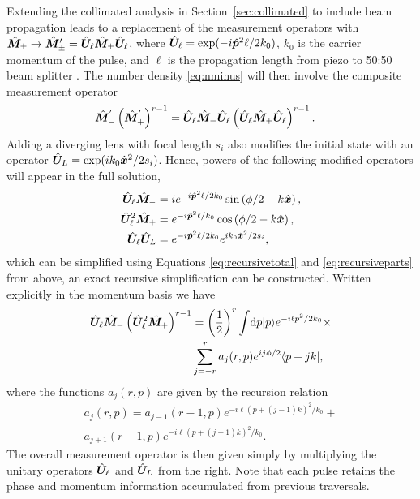 Extending the collimated analysis in Section~\ref{sec:collimated} to include beam propagation leads to a replacement of the measurement operators with $\hat{\bm M}_\pm \to \hat{\bm M}'_\pm = \hat{\bm U}_\ell \hat{\bm M}_\pm \hat{\bm U}_\ell$, where $\hat{\bm U}_\ell = \exp(-i \hat{\bm p}^2 \ell / 2 k_0)$, $k_0$ is the carrier momentum of the pulse, and $\ell$ is the propagation length from piezo to 50:50 beam splitter \cite{Born1959}.  The number density \eqref{eq:nminus} will then involve the composite measurement operator 
\begin{align}\label{eq:recursivetotal}
  \hat{\bm M}_-^{'}\left(\hat{\bm M}_+^{'}\right)^{r-1} &= \hat{\bm U}_\ell\hat{\bm M}_-\hat{\bm U}_\ell \left(\hat{\bm U}_\ell\hat{\bm M}_+\hat{\bm U}_\ell\right)^{r-1}.
\end{align}  
Adding a diverging lens with focal length $s_i$ also modifies the initial state with an operator $\hat{\bm U}_L = \exp(i k_0 \hat{\bm x}^2 / 2 s_i)$.  Hence, powers of the following modified operators will appear in the full solution,
\begin{subequations}\label{eq:recursiveparts}
\begin{align}
  \hat{\bm U}_\ell\hat{\bm M}_- &= i e^{-i\hat{\bm p}^2\ell/2k_0}\sin\left(\phi/2 - k\hat{\bm x}\right) , \\
  \hat{\bm U}_\ell^2 \hat{\bm M}_+ &= e^{-i\hat{\bm p}^2\ell/k_0}\cos\left(\phi/2 - k\hat{\bm x}\right) , \\
  \hat{\bm U}_\ell\hat{\bm U}_L &= e^{-i\hat{\bm p}^2\ell/2k_0}e^{ik_0\hat{\bm x}^2/2s_i},
\end{align}
\end{subequations}
which can be simplified using Equations \eqref{eq:recursivetotal} and \eqref{eq:recursiveparts} from above, an exact recursive simplification can be constructed.  Written explicitly in the momentum basis we have 
\begin{align}
\nonumber\hat{\bm U}_\ell\hat{\bm M}_-\left(\hat{\bm U}_\ell^2 \hat{\bm M}_+\right)^{r-1} &= \left(\frac{1}{2}\right)^{r}\int\! \mathrm{d}p\lvert p\rangle e^{-i\ell p^2/2k_0} \times \\ &\sum^r_{j=-r}a_j(r,p) e^{ij\phi/2}\langle p + jk \rvert,
\end{align} 
where the functions $a_j(r,p)$ are given by the recursion relation
\begin{align}
\nonumber a_{j}(r,p) = a_{j-1}(r-1,p)e^{-i\ell(p+(j-1)k)^2/k_0} +\\ a_{j+1}(r-1,p)e^{-i\ell(p+(j+1)k)^2/k_0}.
\end{align}
The overall measurement operator is then given simply by multiplying the unitary operators $\hat{\bm U}_\ell$ and $\hat{\bm U}_L$ from the right.  Note that each pulse retains the phase and momentum information accumulated from previous traversals.   

